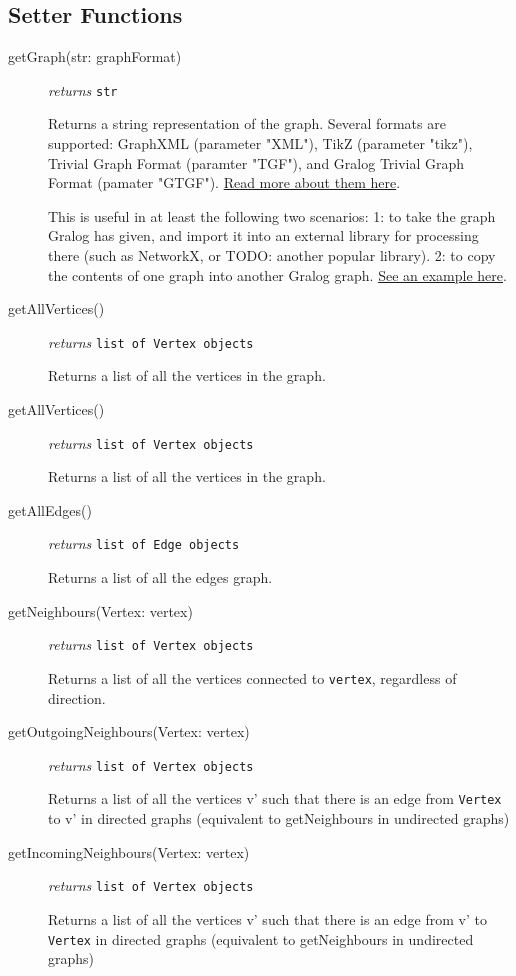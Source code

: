 \documentclass{article}
\newcounter{example}
\newlength\q
\begin{document}
\subsection{Setter Functions}
\begin{description}
\item[getGraph(str: graphFormat)]\emph{returns}
  \texttt{str}

Returns a string representation of the graph. Several formats are supported: GraphXML (parameter "XML"), TikZ (parameter "tikz"), Trivial Graph Format (paramter "TGF"), and Gralog Trivial Graph Format (pamater "GTGF"). \hyperref[graphFormatsInDetail]{Read more about them here}.

This is useful in at least the following two scenarios: 1: to take the graph Gralog has given, and import it into an external library for processing there (such as NetworkX, or TODO: another popular library). 2: to copy the contents of one graph into another Gralog graph. \hyperref[getGraphExample]{See an example here}.

\item[getAllVertices()]\emph{returns}
  \texttt{list of Vertex objects}

Returns a list of all the vertices in the graph.


\item[getAllVertices()]\emph{returns}
  \texttt{list of Vertex objects}

Returns a list of all the vertices in the graph.

\item[getAllEdges()]\emph{returns}
  \texttt{list of Edge objects}

Returns a list of all the edges graph.

\item[getNeighbours(Vertex: vertex)]\emph{returns}
  \texttt{list of Vertex objects}

Returns a list of all the vertices connected to \texttt{vertex}, regardless of direction.

\item[getOutgoingNeighbours(Vertex: vertex)]\emph{returns}
  \texttt{list of Vertex objects}

Returns a list of all the vertices v' such that there is an edge from \texttt{Vertex} to v' in directed graphs (equivalent to getNeighbours in undirected graphs)

\item[getIncomingNeighbours(Vertex: vertex)]\emph{returns}
  \texttt{list of Vertex objects}

Returns a list of all the vertices v' such that there is an edge from v' to \texttt{Vertex} in directed graphs (equivalent to getNeighbours in undirected graphs)

\end{description}
\end{document}
